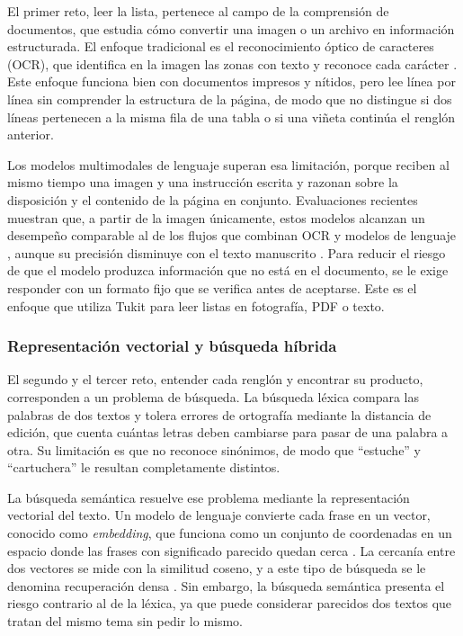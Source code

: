 El primer reto, leer la lista, pertenece al campo de la comprensión de documentos, que
estudia cómo convertir una imagen o un archivo en información estructurada. El enfoque
tradicional es el reconocimiento óptico de caracteres (OCR), que identifica en la imagen las
zonas con texto y reconoce cada carácter \citep{smith_overview_2007}. Este enfoque funciona
bien con documentos impresos y nítidos, pero lee línea por línea sin comprender la
estructura de la página, de modo que no distingue si dos líneas pertenecen a la misma fila
de una tabla o si una viñeta continúa el renglón anterior.\par

Los modelos multimodales de lenguaje superan esa limitación, porque reciben al mismo tiempo
una imagen y una instrucción escrita y razonan sobre la disposición y el contenido de la
página en conjunto. Evaluaciones recientes muestran que, a partir de la imagen únicamente,
estos modelos alcanzan un desempeño comparable al de los flujos que combinan OCR y modelos
de lenguaje \citep{shen_ocr_2026}, aunque su precisión disminuye con el texto manuscrito
\citep{liu_ocrbench_2024}. Para reducir el riesgo de que el modelo produzca información que
no está en el documento, se le exige responder con un formato fijo que se verifica antes de
aceptarse. Este es el enfoque que utiliza Tukit para leer listas en fotografía, PDF o
texto.\par

\subsubsection{Representación vectorial y búsqueda híbrida}

El segundo y el tercer reto, entender cada renglón y encontrar su producto, corresponden a un
problema de búsqueda. La búsqueda léxica compara las palabras de dos textos y tolera
errores de ortografía mediante la distancia de edición, que cuenta cuántas letras deben
cambiarse para pasar de una palabra a otra. Su limitación es que no reconoce sinónimos, de
modo que ``estuche'' y ``cartuchera'' le resultan completamente distintos.\par

La búsqueda semántica resuelve ese problema mediante la representación vectorial del texto.
Un modelo de lenguaje convierte cada frase en un vector, conocido como \emph{embedding}, que
funciona como un conjunto de coordenadas en un espacio donde las frases con significado
parecido quedan cerca \citep{reimers_sentence-bert_2019}. La cercanía entre dos vectores se
mide con la similitud coseno, y a este tipo de búsqueda se le denomina recuperación densa
\citep{karpukhin_dense_2020}. Sin embargo, la búsqueda semántica presenta el riesgo
contrario al de la léxica, ya que puede considerar parecidos dos textos que tratan del mismo
tema sin pedir lo mismo.\par

